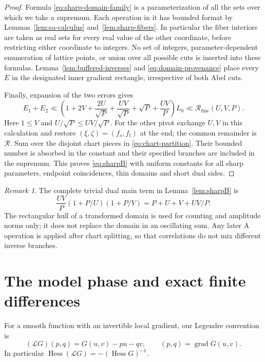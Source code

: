 \documentclass[11pt,a4paper]{article}
\numberwithin{equation}{section}
\theoremstyle{remark}
\newtheorem{remark}[theorem]{Remark}
\DeclareMathOperator{\Hess}{Hess}
\DeclareMathOperator{\grad}{grad}
\newcommand{\Leg}{\mathcal L}
\newcommand{\Rfine}{\mathcal R_{\mathrm{fine}}}
\begin{document}
\begin{proof}
Formula \eqref{eq:sharp-domain-family} is a parameterization of all the
sets over which we take a supremum. Each operation in it has bounded
format by Lemmas~\ref{lem:sa-calculus} and~\ref{lem:sharp-fibers}.
In particular the fiber interiors are taken as real sets for every real
value of the other coordinate, before restricting either coordinate to
integers. No set of integers, parameter-dependent enumeration of lattice
points, or union over all possible cuts is inserted into these formulas.
Lemma~\ref{lem:buffered-inverses} and
\eqref{eq:domain-provenance} place every $E$ in the designated inner
gradient rectangle, irrespective of both Abel cuts.

Finally, expansion of the two errors gives
\[
 E_1+E_2\ll
 \left(1+2V+\frac{2U}{\sqrt P}+\frac{UV}{\sqrt P}
             +\sqrt P+\frac{UV}{P}\right)L_0
 \ll\Rfine(U,V,P).
\]
Here $1\le V$ and $U/\sqrt P\le UV/\sqrt P$.
For the other pivot exchange $U,V$ in this calculation and restore
$(\xi,\zeta)=(f_s,f_t)$ at the end; the common remainder is
$\mathcal R$. Sum over the disjoint chart pieces in
\eqref{eq:chart-partition}. Their bounded number is absorbed in the
constant and their specified branches are included in the supremum.
This proves \eqref{eq:sharpB} with uniform constants for all sharp
parameters, endpoint coincidences, thin domains and short dual sides.
\end{proof}

\begin{remark}\label{rem:trivialdual}
The complete trivial dual main term in Lemma~\ref{lem:sharpB} is
\begin{equation}\label{eq:trivial-dual}
 \frac{UV}{P}(1+P/U)(1+P/V)=P+U+V+UV/P.
\end{equation}
The rectangular hull of a transformed domain is used for counting and
amplitude norms only; it does not replace the domain in an oscillating sum.
Any later A operation is applied after chart splitting, so that correlations
do not mix different inverse branches.
\end{remark}

\section{The model phase and exact finite differences}
\label{sec:model}
For a smooth function with an invertible local gradient, our Legendre
convention is
\[
 (\Leg G)(p,q)=G(u,v)-pu-qv,\qquad (p,q)=\grad G(u,v).
\]
In particular $\Hess(\Leg G)=-(\Hess G)^{-1}$.
\end{document}
